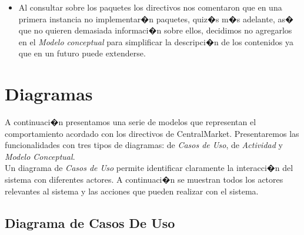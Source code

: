 \documentclass[11pt, a4paper, spanish]{article}
\begin{document}
\begin{itemize}
	\item{ Al consultar sobre los paquetes los directivos nos comentaron que en una primera instancia no implementar�n paquetes, quiz�s m�s adelante, as� que no quieren demasiada informaci�n sobre ellos, decidimos no agregarlos en el \emph{Modelo conceptual} para simplificar la descripci�n de los contenidos ya que en un 
futuro puede extenderse.}



\end{itemize}

	
\section{Diagramas}
	
	A continuaci�n presentamos una serie de modelos que representan el comportamiento acordado con los directivos de CentralMarket.
Presentaremos las funcionalidades con tres tipos de diagramas: de \emph{Casos de Uso}, de \emph{Actividad} y \emph{Modelo Conceptual}.\\

	Un diagrama de \emph{Casos de Uso} permite identificar claramente la interacci�n del sistema con diferentes actores. A continuaci�n se muestran todos los actores relevantes al sistema y las acciones que pueden realizar con el sistema.

\newpage

\subsection{Diagrama de Casos De Uso}
\end{document}
